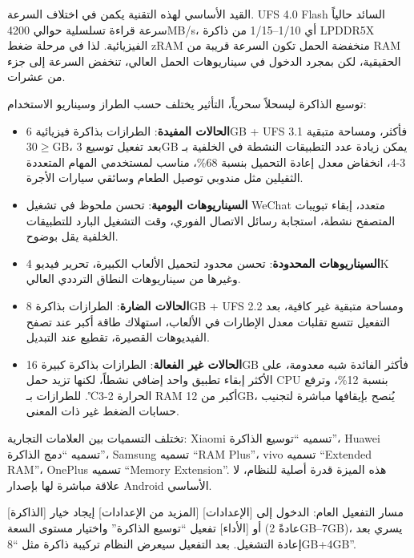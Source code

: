 القيد الأساسي لهذه التقنية يكمن في اختلاف السرعة. UFS 4.0 Flash السائد حالياً سرعة قراءة تسلسلية حوالي 4200MB/s، أي 1/10–1/15 من ذاكرة LPDDR5X الفيزيائية. لذا في مرحلة ضغط zRAM منخفضة الحمل تكون السرعة قريبة من RAM الحقيقية، لكن بمجرد الدخول في سيناريوهات الحمل العالي، تنخفض السرعة إلى جزء من عشرات.


توسيع الذاكرة ليسحلاً سحرياً، التأثير يختلف حسب الطراز وسيناريو الاستخدام:

\begin{itemize}
  \item \textbf{الحالات المفيدة}: الطرازات بذاكرة فيزيائية 6GB + UFS 3.1 فأكثر، ومساحة متبقية $\geq$30GB، بعد تفعيل توسيع 3GB يمكن زيادة عدد التطبيقات النشطة في الخلفية بـ 3-4، انخفاض معدل إعادة التحميل بنسبة 68\%، مناسب لمستخدمي المهام المتعددة الثقيلين مثل مندوبي توصيل الطعام وسائقي سيارات الأجرة.
  \item \textbf{السيناريوهات اليومية}: تحسن ملحوظ في تشغيل WeChat متعدد، إبقاء تبويبات المتصفح نشطة، استجابة رسائل الاتصال الفوري، وقت التشغيل البارد للتطبيقات الخلفية يقل بوضوح.
  \item \textbf{السيناريوهات المحدودة}: تحسن محدود لتحميل الألعاب الكبيرة، تحرير فيديو 4K وغيرها من سيناريوهات النطاق الترددي العالي.
  \item \textbf{الحالات الضارة}: الطرازات بذاكرة 8GB + UFS 2.2 ومساحة متبقية غير كافية، بعد التفعيل تتسع تقلبات معدل الإطارات في الألعاب، استهلاك طاقة أكبر عند تصفح الفيديوهات القصيرة، تقطيع عند التبديل.
  \item \textbf{الحالات غير الفعالة}: الطرازات بذاكرة كبيرة 16GB فأكثر الفائدة شبه معدومة، على الأكثر إبقاء تطبيق واحد إضافي نشطاً، لكنها تزيد حمل CPU بنسبة 12\%، وترفع الحرارة 2-3℃. للطرازات بـ RAM أكبر من 12GB، يُنصح بإيقافها مباشرة لتجنيب حسابات الضغط غير ذات المعنى.
\end{itemize}


تختلف التسميات بين العلامات التجارية: Xiaomi تسميه “توسيع الذاكرة”، Huawei تسميه “دمج الذاكرة”، Samsung تسميه “RAM Plus”، vivo تسميه “Extended RAM”، OnePlus تسميه “Memory Extension”. هذه الميزة قدرة أصلية للنظام، لا علاقة مباشرة لها بإصدار Android الأساسي.

مسار التفعيل العام: الدخول إلى [الإعدادات] [المزيد من الإعدادات] إيجاد خيار [الذاكرة] أو [الأداء] تفعيل “توسيع الذاكرة” واختيار مستوى السعة (عادةً 2GB–7GB)، يسري بعد إعادة التشغيل. بعد التفعيل سيعرض النظام تركيبة ذاكرة مثل “8GB+4GB”.


